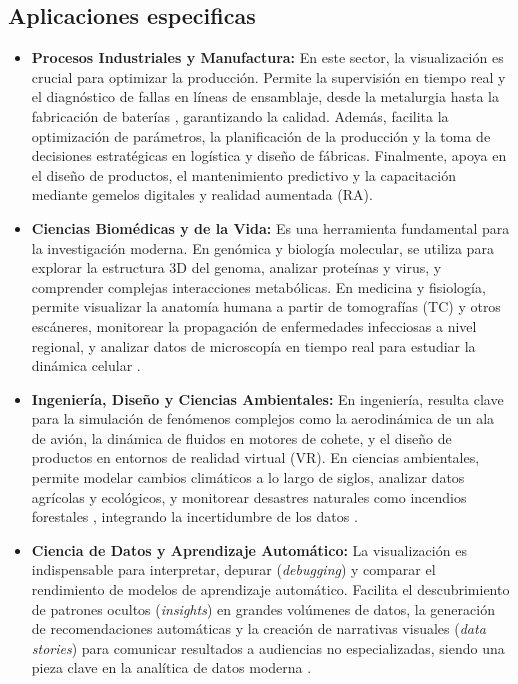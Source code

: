 \documentclass[12pt,a4paper]{article}
\begin{document}
\subsection*{Aplicaciones especificas}

\begin{itemize}
    \item \textbf{Procesos Industriales y Manufactura:} En este sector, la visualización es crucial para optimizar la producción. Permite la supervisión en tiempo real y el diagnóstico de fallas en líneas de ensamblaje, desde la metalurgia hasta la fabricación de baterías \cite{ZHANG2025}, garantizando la calidad. Además, facilita la optimización de parámetros, la planificación de la producción y la toma de decisiones estratégicas en logística y diseño de fábricas. Finalmente, apoya en el diseño de productos, el mantenimiento predictivo y la capacitación mediante gemelos digitales y realidad aumentada (RA).

    \item \textbf{Ciencias Biomédicas y de la Vida:} Es una herramienta fundamental para la investigación moderna. En genómica y biología molecular, se utiliza para explorar la estructura 3D del genoma, analizar proteínas y virus, y comprender complejas interacciones metabólicas. En medicina y fisiología, permite visualizar la anatomía humana a partir de tomografías (TC) y otros escáneres, monitorear la propagación de enfermedades infecciosas a nivel regional, y analizar datos de microscopía en tiempo real para estudiar la dinámica celular \cite{nayak2019}.

    \item \textbf{Ingeniería, Diseño y Ciencias Ambientales:} En ingeniería, resulta clave para la simulación de fenómenos complejos como la aerodinámica de un ala de avión, la dinámica de fluidos en motores de cohete, y el diseño de productos en entornos de realidad virtual \cite{ZHANG202322} (VR). En ciencias ambientales, permite modelar cambios climáticos a lo largo de siglos, analizar datos agrícolas y ecológicos, y monitorear desastres naturales como incendios forestales \cite{Andrienko2020}, integrando la incertidumbre de los datos \cite{ZHANG202322}.

    \item \textbf{Ciencia de Datos y Aprendizaje Automático:} La visualización es indispensable para interpretar, depurar (\textit{debugging}) y comparar el rendimiento de modelos de aprendizaje automático. Facilita el descubrimiento de patrones ocultos (\textit{insights}) en grandes volúmenes de datos, la generación de recomendaciones automáticas y la creación de narrativas visuales (\textit{data stories}) para comunicar resultados a audiencias no especializadas, siendo una pieza clave en la analítica de datos moderna \cite{Andrienko2020}.


\end{itemize}
\end{document}
